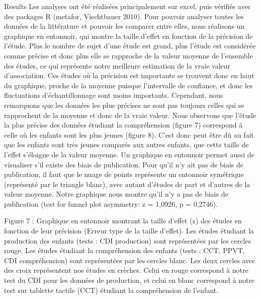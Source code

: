 \documentclass[english,man]{apa6}
\theoremstyle{definition}
\theoremstyle{definition}
\theoremstyle{definition}
\theoremstyle{remark}
\begin{document}
Results Les analyses ont été réalisées principalement sur excel, puis
vérifiés avec des packages R (metafor, Viechtbauer 2010). Pour pouvoir
analyser toutes les données de la littérature et pouvoir les comparer
entre elles, nous réalisons un graphique en entonnoir, qui montre la
taille d'effet en fonction de la précision de l'étude. Plus le nombre de
sujet d'une étude est grand, plus l'étude est considérée comme précise
et donc plus elle se rapproche de la valeur moyenne de l'ensemble des
études, ce qui représente notre meilleure estimation de la vraie valeur
d'association. Ces études où la précision est importante se trouvent
donc en haut du graphique, proche de la moyenne puisque l'intervalle de
confiance, et donc les fluctuations d'échantillonnage sont moins
importants. Cependant, nous remarquons que les données les plus précises
ne sont pas toujours celles qui se rapprochent de la moyenne et donc de
la vraie valeur. Nous observons que l'étude la plus précise des données
étudiant la compréhension (figure 7) correspond à celle où les enfants
sont les plus jeunes (figure 8). C'est donc peut être dû au fait que les
enfants sont très jeunes comparés aux autres enfants, que cette taille
de l'effet s'éloigne de la valeur moyenne. Un graphique en entonnoir
permet aussi de visualiser s'il existe des biais de publication. Pour
qu'il n'y ait pas de biais de publication, il faut que le nuage de
points représente un entonnoir symétrique (représenté par le triangle
blanc), avec autant d'études de part et d'autres de la valeur moyenne.
Notre graphique nous montre qu'il n'y a pas de biais de publication
(test for funnel plot asymmetry: z = 1,0926, p = 0,2746).

Figure 7 : Graphique en entonnoir montrant la taille d'effet (z) des
études en fonction de leur précision (Erreur type de la taille d'effet).
Les études étudiant la production des enfants (tests : CDI production)
sont représentées par les cercles rouge. Les études étudiant la
compréhension des enfants (tests : CCT, PPVT, CDI compréhension) sont
représentées par les cercles blanc. Les deux cercles avec des croix
représentent nos études en crèches. Celui en rouge correspond à notre
test du CDI pour les données de production, et celui en blanc correspond
à notre test sur tablette tactile (CCT) étudiant la compréhension de
l'enfant.
\end{document}
